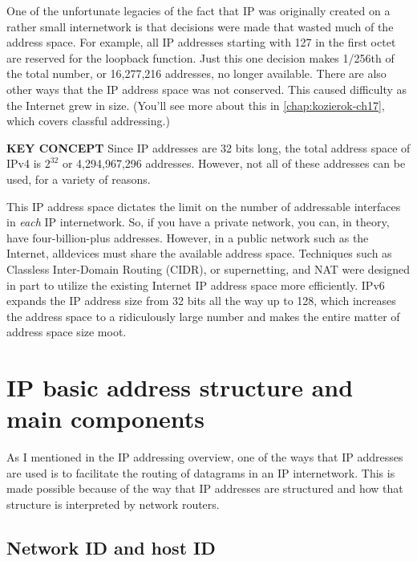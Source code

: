 One of the unfortunate legacies of the fact that IP was originally
created on a rather small internetwork is that decisions were made that
wasted much of the address space. For example, all IP addresses starting
with 127 in the first octet are reserved for the loopback function. Just
this one decision makes 1/256th of the total number, or 16,277,216
addresses, no longer available. There are also other ways that the IP
address space was not conserved. This caused difficulty as the Internet
grew in size. (You'll see more about this in \vref{chap:kozierok-ch17}, which covers classful addressing.)


{\textbf{KEY CONCEPT}} Since IP addresses are 32 bits long, the total
address space of IPv4 is $2^{32}$ or 4,294,967,296 addresses.
However, not all of these addresses can be used, for a variety of reasons.

This IP address space dictates the limit on the number of addressable
interfaces in \emph{each} IP internetwork. So, if you have a private
network, you can, in theory, have four-billion-plus addresses. However,
in a public network such as the Internet, alldevices must share the
available address space. Techniques such as Classless Inter-Domain
Routing (CIDR), or supernetting, and NAT were designed in part to
utilize the existing Internet IP address space more efficiently. IPv6
expands the IP address size from 32 bits all the way up to 128, which
increases the address space to a ridiculously large number and makes the
entire matter of address space size moot.



\section{IP basic address structure and main components}

As I mentioned in the IP addressing overview, one of the ways that IP
addresses are used is to facilitate the routing of datagrams in an IP
internetwork. This is made possible because of the way that IP addresses
are structured and how that structure is interpreted by network routers.



\subsection{Network ID and host ID}

